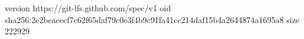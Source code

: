 version https://git-lfs.github.com/spec/v1
oid sha256:2e2beaeecf7c62f65daf79c0e3f4b9c91fa41cc214daf15b4a2644874a1695a8
size 222929
